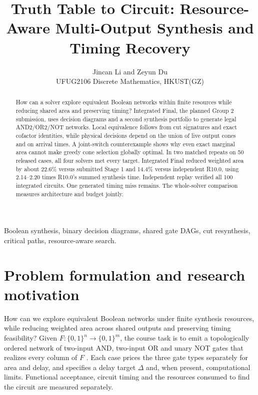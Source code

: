 \documentclass[journal,10pt]{IEEEtran}
\title{Truth Table to Circuit: Resource-Aware Multi-Output Synthesis and Timing Recovery}
\author{Jincan Li and Zeyun Du\\UFUG2106 Discrete Mathematics, HKUST(GZ)}
\begin{document}
\maketitle
\begin{abstract}
How can a solver explore equivalent Boolean networks within finite resources while reducing shared area and preserving timing? Integrated Final, the planned Group 2 submission, uses decision diagrams and a second synthesis portfolio to generate legal AND2/OR2/NOT networks. Local equivalence follows from cut signatures and exact cofactor identities, while physical decisions depend on the union of live output cones and on arrival times. A joint-switch counterexample shows why even exact marginal area cannot make greedy cone selection globally optimal. In two matched repeats on 50 released cases, all four solvers met every target. Integrated Final reduced weighted area by about 22.6\% versus submitted Stage 1 and 14.4\% versus independent R10.0, using 2.14--2.20 times R10.0's summed synthesis time. Independent replay verified all 100 integrated circuits. One generated timing miss remains. The whole-solver comparison measures architecture and budget jointly.
\end{abstract}
\begin{IEEEkeywords}
Boolean synthesis, binary decision diagrams, shared gate DAGs, cut resynthesis, critical paths, resource-aware search.
\end{IEEEkeywords}

\section{Problem formulation and research motivation}
How can we explore equivalent Boolean networks under finite synthesis resources, while reducing weighted area across shared outputs and preserving timing feasibility? Given \(F:\{0,1\}^n\to\{0,1\}^m\), the course task is to emit a topologically ordered network of two-input AND, two-input OR and unary NOT gates that realizes every column of \(F\) \cite{course2026}. Each case prices the three gate types separately for area and delay, and specifies a delay target \(\Delta\) and, when present, computational limits. Functional acceptance, circuit timing and the resources consumed to find the circuit are measured separately.
\end{document}
